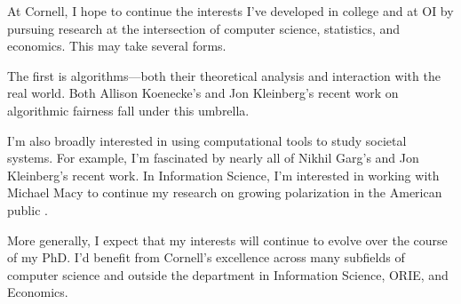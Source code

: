 \documentclass{grad-statement}
\begin{document}
At Cornell, I hope to continue the interests I've developed in college and at OI by pursuing research at the intersection of computer science, statistics, and economics.
This may take several forms.

The first is algorithms---both their theoretical analysis and interaction with the real world.
Both Allison Koenecke's and Jon Kleinberg's recent work on algorithmic fairness fall under this umbrella.

I’m also broadly interested in using computational tools to study societal systems.
For example, I'm fascinated by nearly all of Nikhil Garg's and Jon Kleinberg's recent work.
In Information Science, I'm interested in working with Michael Macy to continue my research on growing polarization in the American public .

\medskip

More generally, I expect that my interests will continue to evolve over the course of my PhD.
I'd benefit from Cornell's excellence across many subfields of computer science and outside the department in Information Science, ORIE, and Economics.
\end{document}
